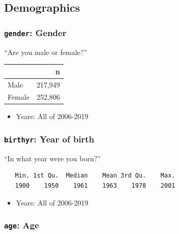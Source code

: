 \documentclass[10pt,article,oneside]{memoir}
\theoremstyle{definition}
\begin{document}
\newpage

\hypertarget{demographics}{%
\subsection{Demographics}\label{demographics}}

\hypertarget{gender-gender}{%
\subsubsection{\texorpdfstring{\texttt{gender}:
Gender}{gender: Gender}}\label{gender-gender}}

``Are you male or female?''

\begin{table}[H]
\centering
\begin{tabular}{lr}
\toprule
 & n\\
\midrule
Male & 217,949\\
Female & 252,806\\
\bottomrule
\end{tabular}
\end{table}

\begin{itemize}
\tightlist
\item
  Years: All of 2006-2019
\end{itemize}

\hypertarget{birthyr-year-of-birth}{%
\subsubsection{\texorpdfstring{\texttt{birthyr}: Year of
birth}{birthyr: Year of birth}}\label{birthyr-year-of-birth}}

``In what year were you born?''

\begin{verbatim}
   Min. 1st Qu.  Median    Mean 3rd Qu.    Max. 
   1900    1950    1961    1963    1978    2001 
\end{verbatim}

\begin{itemize}
\tightlist
\item
  Years: All of 2006-2019
\end{itemize}

\hypertarget{age-age}{%
\subsubsection{\texorpdfstring{\texttt{age}:
Age}{age: Age}}\label{age-age}}
\end{document}
